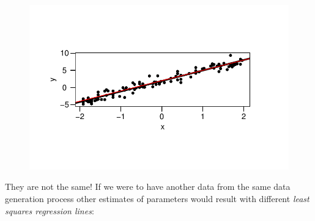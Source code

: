 \documentclass[
  letterpaper,
  DIV=11,
  numbers=noendperiod]{scrreprt}
\begin{document}
\begin{figure}[H]

{\centering \includegraphics{Chapter3_files/figure-pdf/unnamed-chunk-16-1.pdf}

}

\end{figure}

They are not the same! If we were to have another data from the same
data generation process other estimates of parameters would result with
different \emph{least squares regression lines}:
\end{document}
